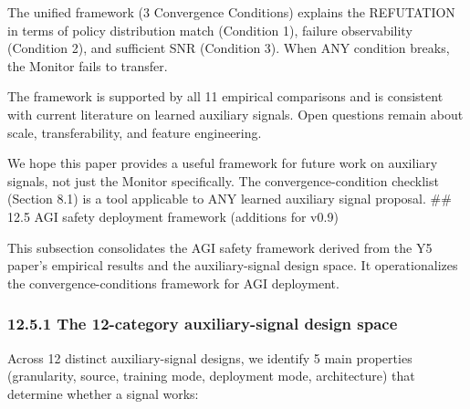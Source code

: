 \documentclass[11pt]{article}
\begin{document}
The unified framework (3 Convergence Conditions) explains the REFUTATION
in terms of policy distribution match (Condition 1), failure
observability (Condition 2), and sufficient SNR (Condition 3). When ANY
condition breaks, the Monitor fails to transfer.

The framework is supported by all 11 empirical comparisons and is
consistent with current literature on learned auxiliary signals. Open
questions remain about scale, transferability, and feature engineering.

We hope this paper provides a useful framework for future work on
auxiliary signals, not just the Monitor specifically. The
convergence-condition checklist (Section 8.1) is a tool applicable to
ANY learned auxiliary signal proposal. \#\# 12.5 AGI safety deployment
framework (additions for v0.9)

This subsection consolidates the AGI safety framework derived from the
Y5 paper's empirical results and the auxiliary-signal design space. It
operationalizes the convergence-conditions framework for AGI deployment.

\subsubsection{12.5.1 The 12-category auxiliary-signal design
space}\label{the-12-category-auxiliary-signal-design-space}

Across 12 distinct auxiliary-signal designs, we identify 5 main
properties (granularity, source, training mode, deployment mode,
architecture) that determine whether a signal works:
\end{document}
